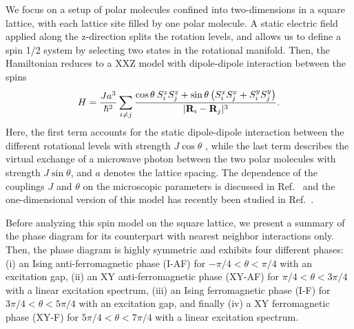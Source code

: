 We focus on a setup of polar molecules confined into two-dimensions in a square lattice,
with each lattice site filled by one polar molecule.  A static electric field applied along
the z-direction splits the rotation levels, and allows us to define a spin 1/2 system by selecting
two states in the rotational manifold. Then, the Hamiltonian reduces to a XXZ model with dipole-dipole interaction
between the spins \cite{gorshkov11}
%
\begin{equation}
  H = \frac{ J a^3}{ \hbar^2}\sum_{i \neq j} \frac{\cos \theta \:
S^{z}_{i}S^{z}_{j}+ \sin \theta
\left( S^{x}_{i} S^{x}_{j} + S^{y}_{i} S^{y}_{j}\right) }{|{\bf R}_{i} - {\bf R}_{j}|^3}.
\end{equation}
%
Here, the first term accounts for the static dipole-dipole
interaction between the different rotational levels with strength $J \cos \theta$ , while the last term
describes the virtual exchange of a microwave photon between the two polar molecules with
strength $J \sin \theta$, and  $a$ denotes the lattice spacing.
The dependence of the couplings $J$ and $\theta$ on the microscopic
parameters is discussed in Ref.~\cite{muller10,gorshkov11,gorshkov11-2} and the one-dimensional version of this model has recently been studied in Ref.~\cite{hauke10}.

Before analyzing this spin model on the square lattice, we present a
summary of the phase diagram
for its counterpart with nearest neighbor interactions only.
Then, the phase diagram is highly symmetric and
exhibits four different phases: (i) an Ising
anti-ferromagnetic phase (I-AF) for $-\pi/4 < \theta < \pi/4$ with an
excitation gap, (ii) an XY anti-ferromagnetic phase (XY-AF) for $\pi/4 < \theta
< 3\pi/4$ with a linear excitation spectrum, (iii) an Ising ferromagnetic phase
(I-F) for $3 \pi/4 < \theta < 5\pi/4$ with an excitation gap, and finally (iv) a
XY ferromagnetic phase (XY-F) for $5 \pi/4 < \theta < 7\pi/4$  with a linear
excitation spectrum.


